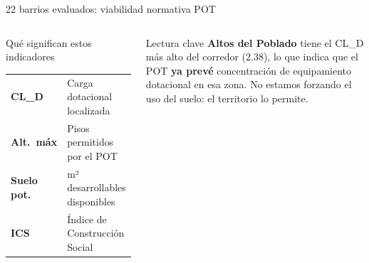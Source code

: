 \documentclass[aspectratio=169, 11pt]{beamer}
\newcommand{\src}[1]{\par\vspace{2pt}{\tiny\textcolor{slate}{Fuente: #1}}}
\begin{document}
\begin{frame}{22 barrios evaluados: viabilidad normativa POT}
\vspace{6pt}
\begin{columns}[T]
\begin{block}{\small Qué significan estos indicadores}
\scriptsize
\begin{tabular}{@{}ll@{}}
\textbf{CL\_D} & Carga dotacional localizada \\
\textbf{Alt.\ máx} & Pisos permitidos por el POT \\
\textbf{Suelo pot.} & m² desarrollables disponibles \\
\textbf{ICS} & Índice de Construcción Social \\
\end{tabular}
\end{block}
\begin{exampleblock}{\small Lectura clave}
\scriptsize \textbf{Altos del Poblado} tiene el CL\_D más alto del corredor (2.38), lo que indica que el POT \textbf{ya prevé} concentración de equipamiento dotacional en esa zona. No estamos forzando el uso del suelo: el territorio lo permite.
\end{exampleblock}
\end{columns}

\src{POT Batería de Indicadores (3ciz-tpgr), 331,741 registros. Lotes Potenciales (m4wi-nn8x), 441,966 registros.}
\end{frame}
\end{document}
